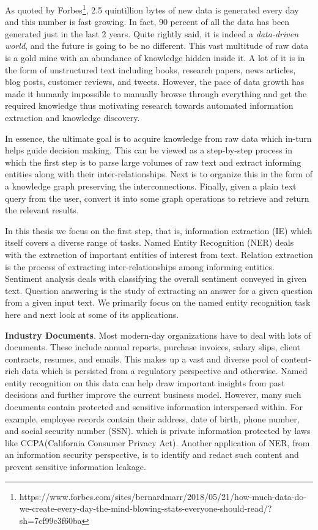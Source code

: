 As quoted by Forbes\footnote{https://www.forbes.com/sites/bernardmarr/2018/05/21/how-much-data-do-we-create-every-day-the-mind-blowing-stats-everyone-should-read/?sh=7cf99c3f60ba}, 2.5 quintillion bytes of new data is generated every day and this number is fast growing. In fact, 90 percent of all the data has been generated just in the last 2 years. Quite rightly said, it is indeed a \textit{data-driven world}, and the future is going to be no different. This vast multitude of raw data is a gold mine with an abundance of knowledge hidden inside it. A lot of it is in the form of unstructured text including books, research papers, news articles, blog posts, customer reviews, and tweets. However, the pace of data growth has made it humanly impossible to manually browse through everything and get the required knowledge thus motivating research towards automated information extraction and knowledge discovery. 

In essence, the ultimate goal is to acquire knowledge from raw data which in-turn helps guide decision making. This can be viewed as a step-by-step process in which the  first step is to parse large volumes of raw text and extract informing entities along with their inter-relationships. Next is to organize this in the form of a knowledge graph preserving the interconnections. Finally, given a plain text query from the user, convert it into some graph operations to retrieve and return the relevant results.

In this thesis we focus on the first step, that is, information extraction (IE) which itself covers a diverse range of tasks. Named Entity Recognition (NER) deals with the extraction of important entities of interest from text. Relation extraction is the process of extracting inter-relationships among informing entities. Sentiment analysis deals with classifying the overall sentiment conveyed in given text. Question answering is the study of extracting an answer for a given question from a given input text. We primarily focus on the named entity recognition task here and next look at some of its applications.

\textbf{Industry Documents}. Most modern-day organizations have to deal with lots of documents. These include annual reports, purchase invoices, salary slips, client contracts, resumes, and emails. This makes up a vast and diverse pool of content-rich data which is persisted from a regulatory perspective and otherwise. Named entity recognition on this data can help draw important insights from past decisions and further improve the current business model. However, many such documents contain protected and sensitive information interspersed within. For example, employee records contain their address, date of birth, phone number, and social security number (SSN). which is private information protected by laws like CCPA(California Consumer Privacy Act). Another application of NER, from an information security perspective, is to identify and redact such content and prevent sensitive information leakage.

